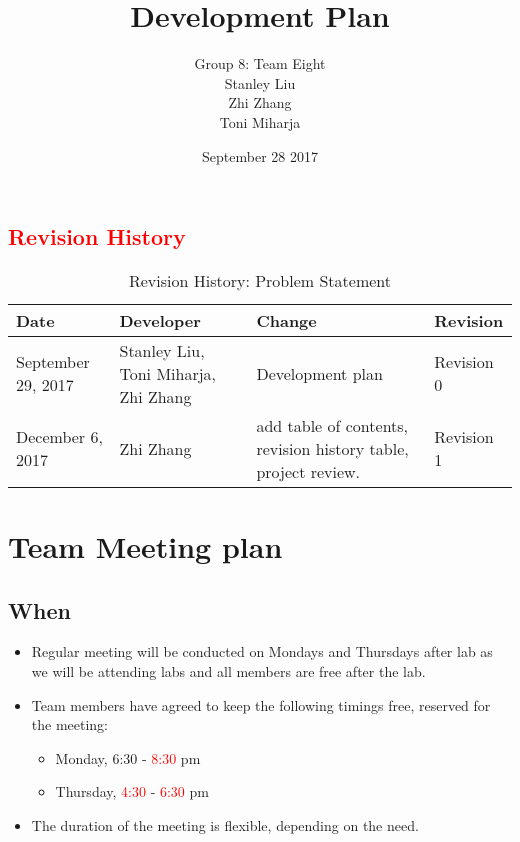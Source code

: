 \documentclass{article}
\title{\textbf{Development Plan}}
\author{Group 8: Team Eight\\
        Stanley Liu\\
        Zhi Zhang\\
        Toni Miharja\\}
\date{September 28 2017}
\begin{document}
\maketitle
\newpage
\textcolor{red}{\tableofcontents}
\newpage

\textcolor{red}{\section{Revision History}}
\begin{table}[h!]
    \centering
    \textcolor{red}{
    \begin{tabular}{|p{2.5cm}|p{3cm}|p{3cm}|p{2cm}|}
    \hline
    \textbf {Date}  & {Developer} & {Change} & {Revision} \\
    \hline
    September 29, 2017 & Stanley Liu, Toni Miharja, Zhi Zhang & Development plan& Revision 0\\
    \hline
    December 6, 2017  & Zhi Zhang  & add table of contents, revision history table, project review.& Revision 1\\
    \hline
    \end{tabular}}
    \textcolor{red}{\caption{Revision History: Problem Statement}}
\end{table}

\newpage


\section{Team Meeting plan}
\subsection{When}
\begin{itemize}
    \item Regular meeting will be conducted on Mondays and Thursdays after lab as we will be attending labs and all members are free after the lab.
    \item Team members have agreed to keep the following timings free, reserved for the meeting:
    \begin{itemize}
        \item Monday, 6:30 - \textcolor{red}{8:30} pm
        \item Thursday, \textcolor{red}{4:30} - \textcolor{red}{6:30} pm
    \end{itemize}
    \item The duration of the meeting is flexible, depending on the need.
\end{itemize}
\end{document}
